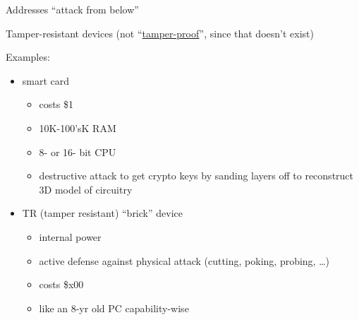 Addresses ``attack from below''

Tamper-resistant devices (not ``\underline{tamper-proof}'', since that doesn't
        exist)

Examples:
\begin{itemize}
    \item smart card
        \begin{itemize}
            \item costs \$1
            \item 10K-100'sK RAM
            \item 8- or 16- bit CPU
            \item destructive attack to get crypto keys by sanding layers off to
                    reconstruct 3D model of circuitry
        \end{itemize}
    \item TR (tamper resistant) ``brick'' device
        \begin{itemize}
            \item internal power
            \item active defense against physical attack (cutting, poking,
                    probing, \dots)
            \item costs \$x00
            \item like an 8-yr old PC capability-wise
        \end{itemize}
\end{itemize}

